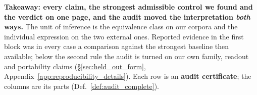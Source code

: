 \begin{table}[t]
\begin{threeparttable}
\caption{\textbf{Takeaway: every claim, the strongest admissible control we found and the verdict
on one page, and the audit moved the interpretation \emph{both} ways.} The unit of inference is the
equivalence class on our corpora and the individual expression on the two external ones. Reported
evidence in the first block was in every case a comparison against the strongest baseline then
available; below the second rule the audit is turned on our own family, readout and portability
claims (\S\ref{sec:held_out_form}, Appendix~\ref{app:reproducibility_details}). Each row is an
\textbf{audit certificate}; the columns are its parts (Def.~\ref{def:audit_complete}).}
\label{tab:entitlements}
\setlength{\tabcolsep}{3pt}
%

\end{threeparttable}
\end{table}
